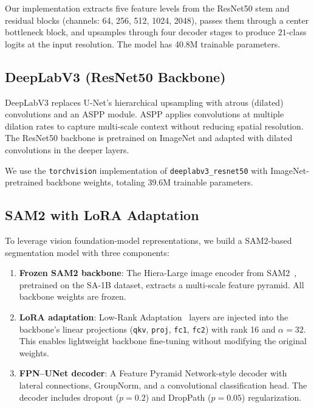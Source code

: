 \documentclass[11pt]{article}
\begin{document}
Our implementation extracts five feature levels from the ResNet50 stem and residual blocks (channels: 64, 256, 512, 1024, 2048), passes them through a center bottleneck block, and upsamples through four decoder stages to produce $21$-class logits at the input resolution. The model has 40.8M trainable parameters.

\subsection{DeepLabV3 (ResNet50 Backbone)}

DeepLabV3 replaces U-Net's hierarchical upsampling with atrous (dilated) convolutions and an ASPP module. ASPP applies convolutions at multiple dilation rates to capture multi-scale context without reducing spatial resolution. The ResNet50 backbone is pretrained on ImageNet and adapted with dilated convolutions in the deeper layers.

We use the \texttt{torchvision} implementation of \texttt{deeplabv3\_resnet50} with ImageNet-pretrained backbone weights, totaling 39.6M trainable parameters.

\subsection{SAM2 with LoRA Adaptation}

To leverage vision foundation-model representations, we build a SAM2-based segmentation model with three components:

\begin{enumerate}
    \item \textbf{Frozen SAM2 backbone}: The Hiera-Large image encoder from SAM2~\cite{ravi2024sam2}, pretrained on the SA-1B dataset, extracts a multi-scale feature pyramid. All backbone weights are frozen.
    \item \textbf{LoRA adaptation}: Low-Rank Adaptation~\cite{hu2022lora} layers are injected into the backbone's linear projections (\texttt{qkv}, \texttt{proj}, \texttt{fc1}, \texttt{fc2}) with rank 16 and $\alpha = 32$. This enables lightweight backbone fine-tuning without modifying the original weights.
    \item \textbf{FPN--UNet decoder}: A Feature Pyramid Network-style decoder with lateral connections, GroupNorm, and a convolutional classification head. The decoder includes dropout ($p = 0.2$) and DropPath ($p = 0.05$) regularization.
\end{enumerate}
\end{document}

